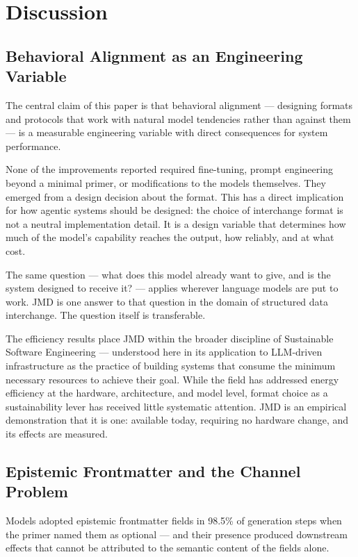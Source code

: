 \documentclass[11pt]{article}
\begin{document}
\section{Discussion}

\subsection{Behavioral Alignment as an Engineering Variable}

The central claim of this paper is that behavioral alignment --- designing formats and protocols that work with natural model tendencies rather than against them --- is a measurable engineering variable with direct consequences for system performance.

None of the improvements reported required fine-tuning, prompt engineering beyond a minimal primer, or modifications to the models themselves. They emerged from a design decision about the format. This has a direct implication for how agentic systems should be designed: the choice of interchange format is not a neutral implementation detail. It is a design variable that determines how much of the model's capability reaches the output, how reliably, and at what cost.

The same question --- what does this model already want to give, and is the system designed to receive it? --- applies wherever language models are put to work. JMD is one answer to that question in the domain of structured data interchange. The question itself is transferable.

The efficiency results place JMD within the broader discipline of Sustainable Software Engineering --- understood here in its application to LLM-driven infrastructure as the practice of building systems that consume the minimum necessary resources to achieve their goal. While the field has addressed energy efficiency at the hardware, architecture, and model level, format choice as a sustainability lever has received little systematic attention. JMD is an empirical demonstration that it is one: available today, requiring no hardware change, and its effects are measured.

\subsection{Epistemic Frontmatter and the Channel Problem}

Models adopted epistemic frontmatter fields in 98.5\% of generation steps when the primer named them as optional --- and their presence produced downstream effects that cannot be attributed to the semantic content of the fields alone.
\end{document}
